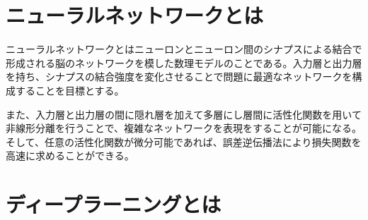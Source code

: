 \section{ニューラルネットワークとは}
ニューラルネットワークとはニューロンとニューロン間のシナプスによる結合で形成される脳のネットワークを模した数理モデルのことである。入力層と出力層を持ち、シナプスの結合強度を変化させることで問題に最適なネットワークを構成することを目標とする。\par
また、入力層と出力層の間に隠れ層を加えて多層にし層間に活性化関数を用いて非線形分離を行うことで、複雑なネットワークを表現をすることが可能になる。そして、任意の活性化関数が微分可能であれば、誤差逆伝播法により損失関数を高速に求めることができる。\par


\section{ディープラーニングとは}

